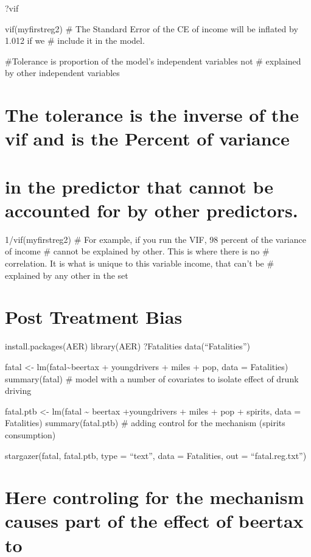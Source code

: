 \documentclass[
]{article}
\begin{document}
?vif

vif(myfirstreg2) \# The Standard Error of the CE of income will be
inflated by 1.012 if we \# include it in the model.

\#Tolerance is proportion of the model's independent variables not \#
explained by other independent variables

\hypertarget{the-tolerance-is-the-inverse-of-the-vif-and-is-the-percent-of-variance}{%
\section{The tolerance is the inverse of the vif and is the Percent of
variance}\label{the-tolerance-is-the-inverse-of-the-vif-and-is-the-percent-of-variance}}

\hypertarget{in-the-predictor-that-cannot-be-accounted-for-by-other-predictors.}{%
\section{in the predictor that cannot be accounted for by other
predictors.}\label{in-the-predictor-that-cannot-be-accounted-for-by-other-predictors.}}

1/vif(myfirstreg2) \# For example, if you run the VIF, 98 percent of the
variance of income \# cannot be explained by other. This is where there
is no \# correlation. It is what is unique to this variable income, that
can't be \# explained by any other in the set

\hypertarget{post-treatment-bias}{%
\section{Post Treatment Bias}\label{post-treatment-bias}}

install.packages(AER) library(AER) ?Fatalities data(``Fatalities'')

fatal \textless- lm(fatal\textasciitilde beertax + youngdrivers + miles
+ pop, data = Fatalities) summary(fatal) \# model with a number of
covariates to isolate effect of drunk driving

fatal.ptb \textless- lm(fatal \textasciitilde{} beertax +youngdrivers +
miles + pop + spirits, data = Fatalities) summary(fatal.ptb) \# adding
control for the mechanism (spirits consumption)

stargazer(fatal, fatal.ptb, type = ``text'', data = Fatalities, out =
``fatal.reg.txt'')

\hypertarget{here-controling-for-the-mechanism-causes-part-of-the-effect-of-beertax-to}{%
\section{Here controling for the mechanism causes part of the effect of
beertax
to}\label{here-controling-for-the-mechanism-causes-part-of-the-effect-of-beertax-to}}
\end{document}
